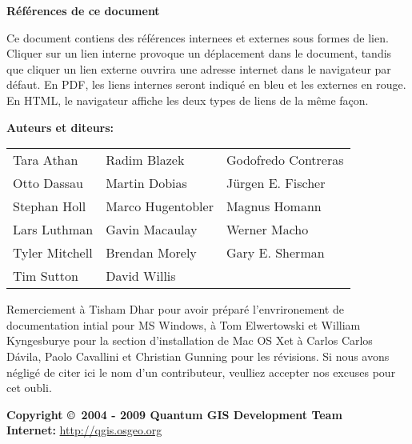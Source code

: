 \textbf{Références de ce document}

Ce document contiens des références internees et externes sous formes de lien. Cliquer sur un lien interne provoque un déplacement dans le document, tandis que cliquer un lien externe ouvrira une adresse internet dans le navigateur par défaut. En PDF, les liens internes seront indiqué en bleu et les externes en rouge. En HTML, le navigateur affiche les deux types de liens de la même façon.

\begin{flushleft}
\textbf{Auteurs et diteurs:}
 
\begin{tabular}{p{5cm} p{5cm} p{5cm}}
Tara Athan & Radim Blazek & Godofredo Contreras \\
Otto Dassau & Martin Dobias & J\"urgen E. Fischer \\ 
Stephan Holl & Marco Hugentobler & Magnus Homann \\ 
Lars Luthman & Gavin Macaulay & Werner Macho \\
Tyler Mitchell & Brendan Morely & Gary E. Sherman \\ 
Tim Sutton & David Willis &  \\
\end{tabular}


Remerciement à Tisham Dhar pour avoir préparé l'envrironement de documentation intial pour MS Windows, à Tom Elwertowski et William Kyngesburye pour la section d'installation de Mac OS Xet à Carlos Carlos D\'{a}vila, Paolo
Cavallini et Christian Gunning pour les révisions. Si nous avons négligé de citer ici le nom d'un contributeur, veulliez accepter nos excuses pour cet oubli.

\textbf{Copyright \copyright~2004 - 2009 Quantum GIS Development Team} \\
\textbf{Internet:} \url{http://qgis.osgeo.org}
\end{flushleft}

